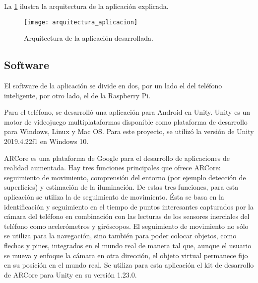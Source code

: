 \documentclass{article}
\newenvironment{standalone}{\begin{preview}}{\end{preview}}
\begin{document}
\begin{standalone}
  La \cref{fig:arquitectura_aplicacion} ilustra la arquitectura de la aplicación explicada.

  \begin{figure}[!ht]
    \centering
    \texttt{[image: arquitectura\_aplicacion]}
    \caption{Arquitectura de la aplicación desarrollada.}
    \label{fig:arquitectura_aplicacion}
  \end{figure}


  \subsection{Software}

  El software de la aplicación se divide en dos, por un lado el del teléfono inteligente, por otro lado, el de la Raspberry Pi.

  Para el teléfono, se desarrolló una aplicación para Android en Unity.
  Unity es un motor de videojuego multiplataformas disponible como plataforma de desarrollo para Windows, Linux y Mac OS.
  Para este proyecto, se utilizó la versión de Unity 2019.4.22f1 en Windows 10.

  ARCore es una plataforma de Google para el desarrollo de aplicaciones de realidad aumentada.
  Hay tres funciones principales que ofrece ARCore: seguimiento de movimiento, comprensión del entorno (por ejemplo detección de superficies) y estimación de la iluminación.
  De estas tres funciones, para esta aplicación se utiliza la de seguimiento de movimiento.
  Ésta se basa en la identificación y seguimiento en el tiempo de puntos interesantes capturados por la cámara del teléfono en combinación con las lecturas de los sensores inerciales del teléfono como acelerómetros y giróscopos.
  El seguimiento de movimiento no sólo se utiliza para la navegación, sino también para poder colocar objetos, como flechas y pines, integrados en el mundo real de manera tal que, aunque el usuario se mueva y enfoque la cámara en otra dirección, el objeto virtual permanece fijo en su posición en el mundo real.
  Se utiliza para esta aplicación el kit de desarrollo de ARCore para Unity en su versión 1.23.0.


\end{standalone}
\end{document}
